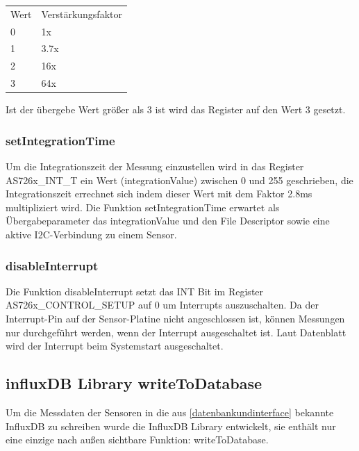 \begin{tabular}{ l l}
 	Wert & Verstärkungsfaktor \\ 
 	0 & 1x \\  
 	1 & 3.7x \\
 	2 & 16x \\  
 	3 & 64x \\
\end{tabular}

Ist der übergebe Wert größer als 3 ist wird das Register auf den Wert 3 gesetzt.

\subsubsection{setIntegrationTime}
Um die Integrationszeit der Messung einzustellen wird in das Register AS726x\_INT\_T ein Wert (integrationValue) zwischen 0 und 255 geschrieben, die Integrationszeit errechnet sich indem dieser Wert mit dem Faktor 2.8ms multipliziert wird.
Die Funktion setIntegrationTime erwartet als Übergabeparameter das integrationValue und den File Descriptor sowie eine aktive I2C-Verbindung zu einem Sensor.\\

\subsubsection{disableInterrupt}
Die Funktion disableInterrupt setzt das INT Bit im Register AS726x\_CONTROL\_SETUP auf 0 um Interrupts auszuschalten.
Da der Interrupt-Pin auf der Sensor-Platine nicht angeschlossen ist, können Messungen nur durchgeführt werden, wenn der Interrupt ausgeschaltet ist.
Laut Datenblatt wird der Interrupt beim Systemstart ausgeschaltet.

\subsection{influxDB Library writeToDatabase}
Um die Messdaten der Sensoren in die aus \ref{datenbankundinterface} bekannte InfluxDB zu schreiben wurde die InfluxDB Library entwickelt, sie enthält nur eine einzige nach außen sichtbare Funktion: writeToDatabase.
